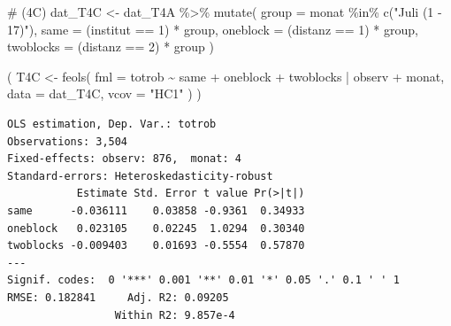 \documentclass[
  a4paper,
  DIV=11,
  oneside]{scrreprt}
\newenvironment{Shaded}{\begin{snugshade}}{\end{snugshade}}
\newcommand{\AttributeTok}[1]{\textcolor[rgb]{0.40,0.45,0.13}{#1}}
\newcommand{\CommentTok}[1]{\textcolor[rgb]{0.37,0.37,0.37}{#1}}
\newcommand{\DecValTok}[1]{\textcolor[rgb]{0.68,0.00,0.00}{#1}}
\newcommand{\FunctionTok}[1]{\textcolor[rgb]{0.28,0.35,0.67}{#1}}
\newcommand{\NormalTok}[1]{\textcolor[rgb]{0.00,0.23,0.31}{#1}}
\newcommand{\OtherTok}[1]{\textcolor[rgb]{0.00,0.23,0.31}{#1}}
\newcommand{\SpecialCharTok}[1]{\textcolor[rgb]{0.37,0.37,0.37}{#1}}
\newcommand{\StringTok}[1]{\textcolor[rgb]{0.13,0.47,0.30}{#1}}
\begin{document}
\begin{Shaded}
\begin{Highlighting}[]
\CommentTok{\# (4C)}
\NormalTok{dat\_T4C }\OtherTok{\textless{}{-}}\NormalTok{ dat\_T4A }\SpecialCharTok{\%\textgreater{}\%}
  \FunctionTok{mutate}\NormalTok{(}
    \AttributeTok{group =}\NormalTok{ monat }\SpecialCharTok{\%in\%} \FunctionTok{c}\NormalTok{(}\StringTok{"Juli (1 {-} 17)"}\NormalTok{),}
    \AttributeTok{same =}\NormalTok{ (institut }\SpecialCharTok{==} \DecValTok{1}\NormalTok{) }\SpecialCharTok{*}\NormalTok{ group,}
    \AttributeTok{oneblock =}\NormalTok{ (distanz }\SpecialCharTok{==} \DecValTok{1}\NormalTok{) }\SpecialCharTok{*}\NormalTok{ group,}
    \AttributeTok{twoblocks =}\NormalTok{ (distanz }\SpecialCharTok{==} \DecValTok{2}\NormalTok{) }\SpecialCharTok{*}\NormalTok{ group}
\NormalTok{  ) }

\NormalTok{(}
\NormalTok{  T4C }\OtherTok{\textless{}{-}} \FunctionTok{feols}\NormalTok{(}
    \AttributeTok{fml =}\NormalTok{ totrob }\SpecialCharTok{\textasciitilde{}} 
\NormalTok{      same}
    \SpecialCharTok{+}\NormalTok{ oneblock}
    \SpecialCharTok{+}\NormalTok{ twoblocks}
    \SpecialCharTok{|}\NormalTok{ observ }\SpecialCharTok{+}\NormalTok{ monat, }
    \AttributeTok{data =}\NormalTok{ dat\_T4C, }
    \AttributeTok{vcov =} \StringTok{"HC1"}
\NormalTok{  )}
\NormalTok{)}
\end{Highlighting}
\end{Shaded}

\begin{verbatim}
OLS estimation, Dep. Var.: totrob
Observations: 3,504
Fixed-effects: observ: 876,  monat: 4
Standard-errors: Heteroskedasticity-robust 
           Estimate Std. Error t value Pr(>|t|) 
same      -0.036111    0.03858 -0.9361  0.34933 
oneblock   0.023105    0.02245  1.0294  0.30340 
twoblocks -0.009403    0.01693 -0.5554  0.57870 
---
Signif. codes:  0 '***' 0.001 '**' 0.01 '*' 0.05 '.' 0.1 ' ' 1
RMSE: 0.182841     Adj. R2: 0.09205 
                 Within R2: 9.857e-4
\end{verbatim}

\begin{Shaded}
\end{Shaded}
\end{document}
